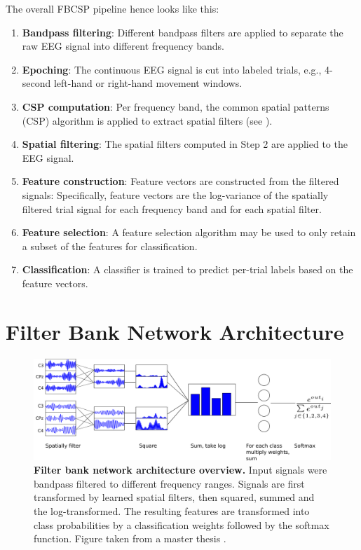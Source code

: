     The overall FBCSP pipeline hence looks like this:

\begin{enumerate}
\item
  \textbf{Bandpass filtering}: Different bandpass filters are applied to
  separate the raw EEG signal into different frequency bands.
\item
  \textbf{Epoching}: The continuous EEG signal is cut into labeled
  trials, e.g., 4-second left-hand or right-hand movement windows.
\item
  \textbf{CSP computation}: Per frequency band, the common spatial
  patterns (CSP) algorithm is applied to extract spatial filters (see
  ).
\item
  \textbf{Spatial filtering}: The spatial filters computed in Step 2 are
  applied to the EEG signal.
\item
  \textbf{Feature construction}: Feature vectors are constructed from
  the filtered signals: Specifically, feature vectors are the
  log-variance of the spatially filtered trial signal for each frequency
  band and for each spatial filter.
\item
  \textbf{Feature selection}: A feature selection algorithm may be used
  to only retain a subset of the features for classification.
\item
  \textbf{Classification}: A classifier is trained to predict per-trial
  labels based on the feature vectors.
\end{enumerate}

\section{Filter Bank Network
Architecture}\label{filter-bank-network-architecture}


\begin{figure}[ht]
    \myfloatalign
    \includegraphics[width=1\linewidth]{images/csp_as_a_net_explanation.png}
    \caption[Filter bank network architecture overview.]{
\textbf{Filter bank network architecture overview.} Input signals were
bandpass filtered to different frequency ranges. Signals are first
transformed by learned spatial filters, then squared, summed and the
log-transformed. The resulting features are transformed into class
probabilities by a classification weights followed by the softmax
function. Figure taken from a master thesis
\citep{schirrmeister_msc_thesis_2015}.}\label{filterbank-net-figure}
\end{figure}


